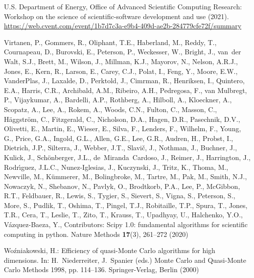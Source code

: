\documentclass[graybox]{svmult}
\begin{document}
\begin{thebibliography}{10}
	{U.S. Department of Energy, Office of Advanced Scientific Computing Research}:
	Workshop on the science of scientific-software development and use (2021).
	\newblock
	\urlprefix\url{https://web.cvent.com/event/1b7d7c3a-e9b4-409d-ae2b-284779cfe72f/summary}

	Virtanen, P., Gommers, R., Oliphant, T.E., Haberland, M., Reddy, T.,
	Cournapeau, D., Burovski, E., Peterson, P., Weckesser, W., Bright, J.,
	van~der Walt, S.J., Brett, M., Wilson, J., Millman, K.J., Mayorov, N.,
	Nelson, A.R.J., Jones, E., Kern, R., Larson, E., Carey, C.J., Polat, I.,
	Feng, Y., Moore, E.W., VanderPlas, J., Laxalde, D., Perktold, J., Cimrman,
	R., Henriksen, I., Quintero, E.A., Harris, C.R., Archibald, A.M., Ribeiro,
	A.H., Pedregosa, F., van Mulbregt, P., Vijaykumar, A., Bardelli, A.P.,
	Rothberg, A., Hilboll, A., Kloeckner, A., Scopatz, A., Lee, A., Rokem, A.,
	Woods, C.N., Fulton, C., Masson, C., H{\"a}ggstr{\"o}m, C., Fitzgerald, C.,
	Nicholson, D.A., Hagen, D.R., Pasechnik, D.V., Olivetti, E., Martin, E.,
	Wieser, E., Silva, F., Lenders, F., Wilhelm, F., Young, G., Price, G.A.,
	Ingold, G.L., Allen, G.E., Lee, G.R., Audren, H., Probst, I., Dietrich, J.P.,
	Silterra, J., Webber, J.T., Slavi{\v c}, J., Nothman, J., Buchner, J.,
	Kulick, J., Sch{\"o}nberger, J.L., de~Miranda~Cardoso, J., Reimer, J.,
	Harrington, J., Rodr{\'\i}guez, J.L.C., Nunez-Iglesias, J., Kuczynski, J.,
	Tritz, K., Thoma, M., Newville, M., K{\"u}mmerer, M., Bolingbroke, M.,
	Tartre, M., Pak, M., Smith, N.J., Nowaczyk, N., Shebanov, N., Pavlyk, O.,
	Brodtkorb, P.A., Lee, P., McGibbon, R.T., Feldbauer, R., Lewis, S., Tygier,
	S., Sievert, S., Vigna, S., Peterson, S., More, S., Pudlik, T., Oshima, T.,
	Pingel, T.J., Robitaille, T.P., Spura, T., Jones, T.R., Cera, T., Leslie, T.,
	Zito, T., Krauss, T., Upadhyay, U., Halchenko, Y.O., V{\'a}zquez-Baeza, Y.,
	Contributors: Scipy 1.0: fundamental algorithms for scientific computing in
	python.
	\newblock Nature Methods \textbf{17}(3), 261--272 (2020)

	Wo{\'z}niakowski, H.: Efficiency of quasi-{M}onte {C}arlo algorithms for high
	dimensions.
	\newblock In: H.~Niederreiter, J.~Spanier (eds.) {M}onte {C}arlo and
	Quasi-{M}onte {C}arlo Methods 1998, pp. 114--136. Springer-Verlag, Berlin
	(2000)

\end{thebibliography}
\end{document}
